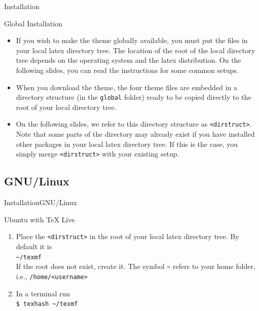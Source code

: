 \documentclass[10pt]{beamer}
\begin{document}
\begin{frame}{Installation}
  \begin{block}{Global Installation}
  \begin{itemize}
     \item If you wish to make the theme globally available, you must put the files in your local latex directory tree. The location of the root of the local directory tree depends on the operating system and the latex distribution. On the following slides, you can read the instructions for some common setups.
    \item When you download the theme, the four theme files are embedded in a directory structure (in the {\tt global} folder) ready to be copied directly to the root of your local directory tree.
    \item On the following slides, we refer to this directory structure as {\tt <dirstruct>}. \alert{Note} that some parts of the directory may already exist if you have installed other packages in your local latex directory tree. If this is the case, you simply merge {\tt <dirstruct>} with your existing setup.
  \end{itemize}
  \end{block}
\end{frame}

\subsection{GNU/Linux}
\begin{frame}{Installation}{GNU/Linux}
  \begin{block}{Ubuntu with TeX Live}
    \begin{enumerate}
      \item Place the {\tt <dirstruct>} in the root of your local latex directory tree. By default it is\\
        {\tt \textasciitilde /texmf}\\
        If the root does not exist, create it. The symbol {\tt \textasciitilde} refers to your home folder, i.e., {\tt /home/<username>}
      \item In a terminal run\\
        {\tt \$ texhash \textasciitilde /texmf}
    \end{enumerate}
  \end{block}
\end{frame}
\end{document}
